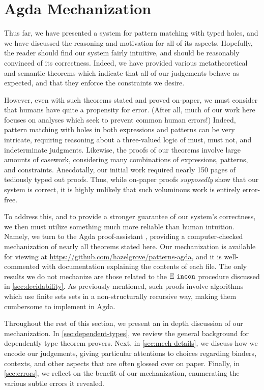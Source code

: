 \section{Agda Mechanization}\label{sec:mechanization}
Thus far, we have presented a system for pattern matching with typed holes, and we have discussed the reasoning and motivation for all of its aspects. Hopefully, the reader should find our system fairly intuitive, and should be reasonably convinced of its correctness. Indeed, we have provided various metatheoretical and semantic theorems which indicate that all of our judgements behave as expected, and that they enforce the constraints we desire.

However, even with such theorems stated and proved on-paper, we must consider that humans have quite a propensity for error. (After all, much of our work here focuses on analyses which seek to prevent common human errors!) Indeed, pattern matching with holes in both expressions and patterns can be very intricate, requiring reasoning about a three-valued logic of must, must not, and indeterminate judgments. Likewise, the proofs of our theorems involve large amounts of casework, considering many combinations of expressions, patterns, and constraints. Anecdotally, our initial work required nearly 150 pages of tediously typed out proofs. Thus, while on-paper proofs \emph{supposedly} show that our system is correct, it is highly unlikely that such voluminous work is entirely error-free.

To address this, and to provide a stronger guarantee of our system's correctness, we then must utilize something much more reliable than human intuition. Namely, we turn to the Agda proof-assistant \cite{norell:thesis}, providing a computer-checked mechanization of nearly all theorems stated here. Our mechanization is available for viewing at \href{https://github.com/hazelgrove/patterns-agda}{https://github.com/hazelgrove/patterns-agda}, and it is well-commented with documentation explaining the contents of each file. The only results we do not mechanize are those related to the $\Xi ~\mathtt{incon}$ procedure discussed in \autoref{sec:decidability}. As previously mentioned, such proofs involve algorithms which use finite sets sets in a non-structurally recursive way, making them cumbersome to implement in Agda.

Throughout the rest of this section, we present an in depth discussion of our mechanization. In \autoref{sec:dependent-types}, we review the general background for dependently type theorem provers. Next, in \autoref{sec:mech-details}, we discuss how we encode our judgements, giving particular attentions to choices regarding binders, contexts, and other aspects that are often glossed over on paper. Finally, in \autoref{sec:errors}, we reflect on the benefit of our mechanization, enumerating the various subtle errors it revealed. 

